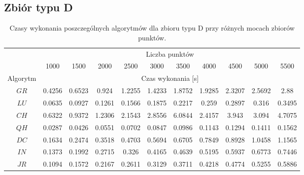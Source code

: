 \documentclass[11pt]{article}
\theoremstyle{remark} \newtheorem{definition}{def.}
\theoremstyle{definition} \newtheorem{twierdzenie}{tw.}
\begin{document}
\subsection{Zbiór typu D}


\begin{table}[]
\centering
\caption{Czasy wykonania poszczególnych algorytmów dla zbioru typu D przy różnych mocach zbiorów punktów.}
\label{tab:kw}
\begin{tabular}{c|c|c|c|c|c|c|c|c|c|c|}
\cline{2-11}
\multicolumn{1}{l|}{} & \multicolumn{10}{c|}{Liczba punktów} \\ \cline{2-11} 
\multicolumn{1}{l|}{} & 1000 & 1500 & 2000 & 2500 & 3000 & 3500 & 4000 & 4500 & 5000 & 5500 \\ \hline
\multicolumn{1}{|c|}{Algorytm} & \multicolumn{10}{c|}{Czas wykonania {[}s{]}} \\ \hline
\multicolumn{1}{|c|}{$GR$} & 0.4256 & 0.6523 & 0.924 & 1.2255 & 1.4233 & 1.8752 & 1.9285 & 2.3207 & 2.5692 & 2.88 \\ \hline
\multicolumn{1}{|c|}{$LU$} & 0.0635 & 0.0927 & 0.1261 & 0.1566 & 0.1875 & 0.2217 & 0.259 & 0.2897 & 0.316 & 0.3495 \\ \hline
\multicolumn{1}{|c|}{$CH$} & 0.6322 & 0.9372 & 1.2306 & 2.1543 & 2.8556 & 6.0844 & 2.4157 & 3.943 & 3.094 & 4.7075 \\ \hline
\multicolumn{1}{|c|}{$QH$} & 0.0287 & 0.0426 & 0.0551 & 0.0702 & 0.0847 & 0.0986 & 0.1143 & 0.1294 & 0.1411 & 0.1562 \\ \hline
\multicolumn{1}{|c|}{$DC$} & 0.1634 & 0.2474 & 0.3518 & 0.4703 & 0.5694 & 0.6705 & 0.7849 & 0.8928 & 1.0458 & 1.1565 \\ \hline
\multicolumn{1}{|c|}{$IN$} & 0.1373 & 0.1992 & 0.2715 & 0.326 & 0.4165 & 0.4639 & 0.5195 & 0.5937 & 0.6773 & 0.7446 \\ \hline
\multicolumn{1}{|c|}{$JR$} & 0.1094 & 0.1572 & 0.2167 & 0.2611 & 0.3129 & 0.3711 & 0.4218 & 0.4774 & 0.5255 & 0.5886 \\ \hline
\end{tabular}
\end{table}
\end{document}
